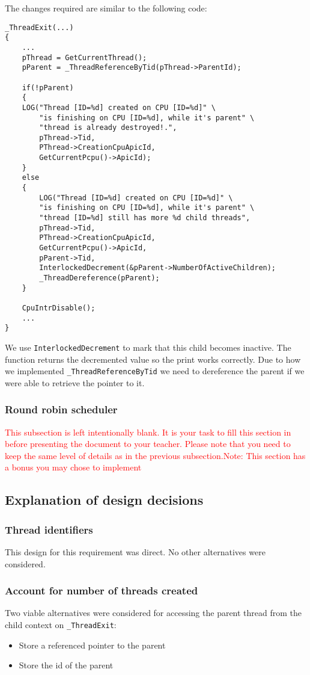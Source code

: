 The changes required are similar to the following code:
\begin{lstlisting}
_ThreadExit(...)
{
    ...
    pThread = GetCurrentThread();
    pParent = _ThreadReferenceByTid(pThread->ParentId);

    if(!pParent)
    {
    LOG("Thread [ID=%d] created on CPU [ID=%d]" \
        "is finishing on CPU [ID=%d], while it's parent" \
        "thread is already destroyed!.",
        pThread->Tid,
        PThread->CreationCpuApicId,
        GetCurrentPcpu()->ApicId);
    }
    else
    {
        LOG("Thread [ID=%d] created on CPU [ID=%d]" \
        "is finishing on CPU [ID=%d], while it's parent" \
        "thread [ID=%d] still has more %d child threads",
        pThread->Tid,
        PThread->CreationCpuApicId,
        GetCurrentPcpu()->ApicId,
        pParent->Tid,
        InterlockedDecrement(&pParent->NumberOfActiveChildren);
        _ThreadDereference(pParent);
    }

    CpuIntrDisable();
    ...
}
\end{lstlisting}
 
We use \lstinline|InterlockedDecrement| to mark that this child becomes inactive. The function returns the decremented value so the print works correctly.
Due to how we implemented \lstinline |_ThreadReferenceByTid| we need to dereference the parent if we were able to retrieve the pointer to it.


\subsubsection{Round robin scheduler}
  \textcolor{red}{This subsection is left intentionally blank. It is your task to fill this section in before presenting the document to your teacher. Please note that you need to keep the same level of details as in the previous subsection.Note: This section has a bonus you may chose to implement } 
 
\subsection{Explanation of design decisions}
 \subsubsection{Thread identifiers}
 This design for this requirement was direct. No other alternatives were considered.
 
 \subsubsection{Account for number of threads created} 
 Two viable alternatives were considered for accessing the parent thread from the child context on \lstinline|_ThreadExit|:
 \begin{itemize}
     \item Store a referenced pointer to the parent
     \item Store the id of the parent
 \end{itemize}
 
